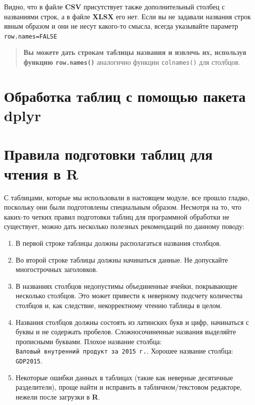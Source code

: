 \documentclass[]{book}
\providecommand{\tightlist}{%
  \setlength{\itemsep}{0pt}\setlength{\parskip}{0pt}}
\begin{document}
Видно, что в файле \textbf{CSV} присутствует также дополнительный
столбец с названиями строк, а в файле \textbf{XLSX} его нет. Если вы не
задавали названия строк явным образом и они не несут какого-то смысла,
всегда указывайте параметр \texttt{row.names=FALSE}

\begin{quote}
\textbf{Вы можете дать строкам таблицы названия и извлечь их, используя
функцию \texttt{row.names()}} аналогично функции \texttt{colnames()} для
столбцов.
\end{quote}

\section{Обработка таблиц с помощью пакета dplyr}\label{table_rules}

\section{Правила подготовки таблиц для чтения в R}\label{table_rules}

С таблицами, которые мы использовали в настоящем модуле, все прошло
гладко, поскольку они были подготовлены специальным образом. Несмотря на
то, что каких-то четких правил подготовки таблиц для программной
обработки не существует, можно дать несколько полезных рекомендаций по
данному поводу:

\begin{enumerate}
\def\labelenumi{\arabic{enumi}.}
\tightlist
\item
  В первой строке таблицы должны располагаться названия столбцов.
\item
  Во второй строке таблицы должны начинаться данные. Не допускайте
  многострочных заголовков.
\item
  В названиях столбцов недопустимы объединенные ячейки, покрывающие
  несколько столбцов. Это может привести к неверному подсчету количества
  столбцов и, как следствие, некорректному чтению таблицы в целом.
\item
  Названия столбцов должны состоять из латинских букв и цифр, начинаться
  с буквы и не содержать пробелов. Сложносочиненные названия выделяйте
  прописными буквами. Плохое название столбца:
  \texttt{Валовый\ внутренний\ продукт\ за\ 2015\ г.}. Хорошее название
  столбца: \texttt{GDP2015}.
\item
  Некоторые ошибки данных в таблицах (такие как неверные десятичные
  разделители), проще найти и исправить в табличном/текстовом редакторе,
  нежели после загрузки в \textbf{R}.
\end{enumerate}
\end{document}
